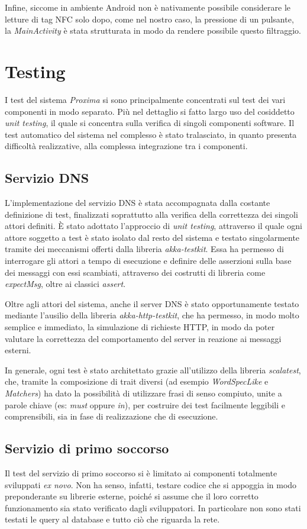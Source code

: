\documentclass[a4paper,12pt]{report}
\begin{document}
Infine, siccome in ambiente Android non è nativamente possibile considerare le letture di tag NFC solo dopo, come nel nostro caso, la pressione di un pulsante, la \emph{MainActivity} è stata strutturata in modo da rendere possibile questo filtraggio.  

\chapter{Testing} 
I test del sistema \emph{Proxima} si sono principalmente concentrati sul test dei vari componenti in modo separato. Più nel dettaglio si fatto largo uso del cosiddetto \emph{unit testing}, il quale si concentra sulla verifica di singoli componenti software. Il test automatico del sistema nel complesso è stato tralasciato, in quanto presenta difficoltà realizzative, alla complessa integrazione tra i componenti.
\section{Servizio DNS}
L'implementazione del servizio DNS è stata accompagnata dalla costante definizione di test, finalizzati soprattutto alla verifica della correttezza dei singoli attori definiti. È stato adottato l'approccio di \emph{unit testing}, attraverso il quale ogni attore soggetto a test è stato isolato dal resto del sistema e testato singolarmente tramite dei meccanismi offerti dalla libreria \emph{akka-testkit}. Essa ha permesso di interrogare gli attori a tempo di esecuzione e definire delle asserzioni sulla base dei messaggi con essi scambiati, attraverso dei costrutti di libreria come \emph{expectMsg}, oltre ai classici \emph{assert}. 

Oltre agli attori del sistema, anche il server DNS è stato opportunamente testato mediante l'ausilio della libreria \emph{akka-http-testkit}, che ha permesso, in modo molto semplice e immediato, la simulazione di richieste HTTP, in modo da poter valutare la correttezza del comportamento del server in reazione ai messaggi esterni.

In generale, ogni test è stato architettato grazie all'utilizzo della libreria \emph{scalatest}, che, tramite la composizione di trait diversi (ad esempio \emph{WordSpecLike} e \emph{Matchers}) ha dato la possibilità di utilizzare frasi di senso compiuto, unite a parole chiave (es: \emph{must} oppure \emph{in}), per costruire dei test facilmente
leggibili e comprensibili, sia in fase di realizzazione che di esecuzione.

\section{Servizio di primo soccorso}
Il test del servizio di primo soccorso si è limitato ai componenti totalmente sviluppati \emph{ex novo}. Non ha senso, infatti, testare codice che si appoggia in modo preponderante su librerie esterne, poiché si assume che il loro corretto funzionamento sia stato verificato dagli sviluppatori. In particolare non sono stati testati le query al database e tutto ciò che riguarda la rete.
\end{document}
